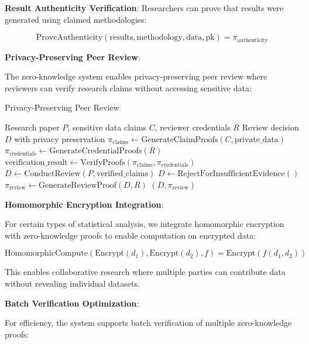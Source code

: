 \documentclass[10pt,twocolumn]{article}
\begin{document}
\textbf{Result Authenticity Verification}: Researchers can prove that results were generated using claimed methodologies:

\begin{equation}
\text{ProveAuthenticity}(\text{results}, \text{methodology}, \text{data}, \text{pk}) = \pi_{\text{authenticity}}
\end{equation}

\textbf{Privacy-Preserving Peer Review}:

The zero-knowledge system enables privacy-preserving peer review where reviewers can verify research claims without accessing sensitive data:

\begin{algorithm}[H]
\caption{Privacy-Preserving Peer Review}
\label{alg:private_review}
\begin{algorithmic}[1]
\REQUIRE Research paper $P$, sensitive data claims $C$, reviewer credentials $R$
\ENSURE Review decision $D$ with privacy preservation
\STATE $\pi_{\text{claims}} \leftarrow \text{GenerateClaimProofs}(C, \text{private\_data})$
\STATE $\pi_{\text{credentials}} \leftarrow \text{GenerateCredentialProofs}(R)$
\STATE $\text{verification\_result} \leftarrow \text{VerifyProofs}(\pi_{\text{claims}}, \pi_{\text{credentials}})$
    \STATE $D \leftarrow \text{ConductReview}(P, \text{verified\_claims})$
\ELSE
    \STATE $D \leftarrow \text{RejectForInsufficientEvidence}()$
\ENDIF
\STATE $\pi_{\text{review}} \leftarrow \text{GenerateReviewProof}(D, R)$
\RETURN $(D, \pi_{\text{review}})$
\end{algorithmic}
\end{algorithm}

\textbf{Homomorphic Encryption Integration}:

For certain types of statistical analysis, we integrate homomorphic encryption with zero-knowledge proofs to enable computation on encrypted data:

\begin{equation}
\text{HomomorphicCompute}(\text{Encrypt}(d_1), \text{Encrypt}(d_2), f) = \text{Encrypt}(f(d_1, d_2))
\end{equation}

This enables collaborative research where multiple parties can contribute data without revealing individual datasets.

\textbf{Batch Verification Optimization}:

For efficiency, the system supports batch verification of multiple zero-knowledge proofs:
\end{document}

